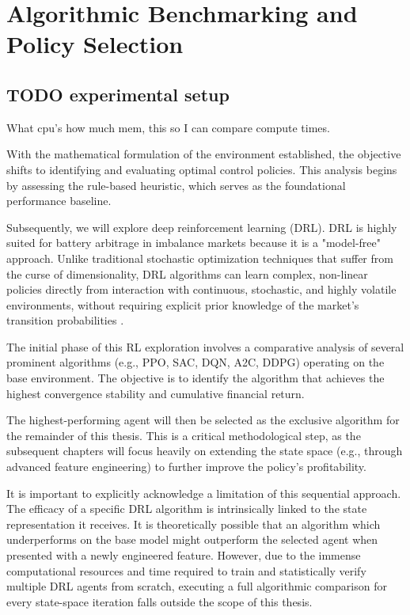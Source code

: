 \section{Algorithmic Benchmarking and Policy Selection}
    \subsection{TODO experimental setup}
        What cpu's how much mem, this so I can compare compute times.

With the mathematical formulation of the environment established, the objective shifts to identifying and evaluating optimal control policies. This analysis begins by assessing the rule-based heuristic, which serves as the foundational performance baseline. 

Subsequently, we will explore deep reinforcement learning (DRL). DRL is highly suited for battery arbitrage in imbalance markets because it is a "model-free" approach. Unlike traditional stochastic optimization techniques that suffer from the curse of dimensionality, DRL algorithms can learn complex, non-linear policies directly from interaction with continuous, stochastic, and highly volatile environments, without requiring explicit prior knowledge of the market's transition probabilities \cite{li2018deepreinforcementlearningoverview, ZHENG2024112084}.

The initial phase of this RL exploration involves a comparative analysis of several prominent algorithms (e.g., PPO, SAC, DQN, A2C, DDPG) operating on the base environment. The objective is to identify the algorithm that achieves the highest convergence stability and cumulative financial return. 

The highest-performing agent will then be selected as the exclusive algorithm for the remainder of this thesis. This is a critical methodological step, as the subsequent chapters will focus heavily on extending the state space (e.g., through advanced feature engineering) to further improve the policy's profitability. 

It is important to explicitly acknowledge a limitation of this sequential approach. The efficacy of a specific DRL algorithm is intrinsically linked to the state representation it receives. It is theoretically possible that an algorithm which underperforms on the base model might outperform the selected agent when presented with a newly engineered feature. However, due to the immense computational resources and time required to train and statistically verify multiple DRL agents from scratch, executing a full algorithmic comparison for every state-space iteration falls outside the scope of this thesis.
    
